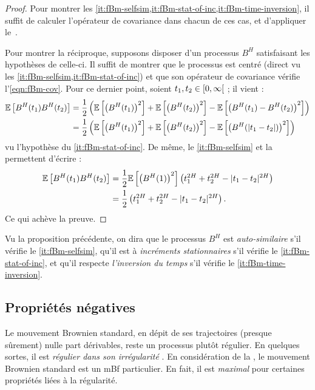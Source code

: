 \begin{proof}
  Pour montrer les
  \cref{it:fBm-selfsim,it:fBm-stat-of-inc,it:fBm-time-inversion}, il
  suffit de calculer l'opérateur de covariance dans chacun de ces cas,
  et d'appliquer le~.

  Pour montrer la réciproque, supposons disposer d'un processus $B^H$
  satisfaisant les hypothèses de celle-ci. Il suffit de montrer que le
  processus est centré (direct vu les
  \cref{it:fBm-selfsim,it:fBm-stat-of-inc}) et que son opérateur de
  covariance vérifie l'\cref{eqn:fBm-cov}. Pour ce dernier point,
  soient $t_1,t_2\in\left[0,\infty\right[$ ; il vient :
  \begin{align*}
    \mathbb{E}\left[B^H(t_1)B^H(t_2)\right] &= \frac{1}{2}\left(\mathbb{E}\left[\left(B^H(t_1)\right)^2\right]+\mathbb{E}\left[\left(B^H(t_2)\right)^2\right]-\mathbb{E}\left[\left(B^H(t_1)-B^H(t_2)\right)^2\right]\right)\\
                           &= \frac{1}{2}\left(\mathbb{E}\left[\left(B^H(t_1)\right)^2\right]+\mathbb{E}\left[\left(B^H(t_2)\right)^2\right]-\mathbb{E}\left[\left(B^H(|t_1-t_2|)\right)^2\right]\right)
  \end{align*}
  vu l'hypothèse du \cref{it:fBm-stat-of-inc}. De même, le
  \cref{it:fBm-selfsim} et la~
  permettent d'écrire :
  \begin{align*}
    \mathbb{E}\left[B^H(t_1)B^H(t_2)\right] &= \frac{1}{2}\mathbb{E}\left[\left(B^H(1)\right)^2\right]\left(t_1^{2H}+t_2^{2H}-|t_1-t_2|^{2H}\right)\\
                           &= \frac{1}{2}\left(t_1^{2H}+t_2^{2H}-|t_1-t_2|^{2H}\right).
  \end{align*}
  Ce qui achève la preuve.
\end{proof}

Vu la proposition précédente, on dira que le processus $B^H$ est
\emph{auto-similaire} s'il vérifie le \cref{it:fBm-selfsim}, qu'il est
à \emph{incréments stationnaires} s'il vérifie le
\cref{it:fBm-stat-of-inc}, et qu'il respecte \emph{l'inversion du
  temps} s'il vérifie le \cref{it:fBm-time-inversion}.

\subsection{Propriétés négatives}
\label{subsec:fBm-absence-of-props}

Le mouvement Brownien standard, en dépit de ses trajectoires (presque
sûrement) nulle part dérivables, reste un processus plutôt
régulier. En quelques sortes, il est \emph{\og régulier dans son
  irrégularité \fg{}}. En considération de la , le
mouvement Brownien standard est un mBf particulier. En fait, il est
\emph{maximal} pour certaines propriétés liées à la régularité.

